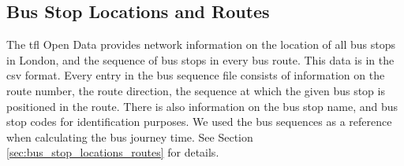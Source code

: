 \subsection{Bus Stop Locations and Routes}
\label{sec:bus_sequence}
\par The \acrshort{tfl} Open Data provides network information on the location of all bus stops in London, and the sequence of bus stops in every bus route. This data is in the \acrfull{csv} format. Every entry in the bus sequence file consists of information on the route number, the route direction, the sequence at which the given bus stop is positioned in the route. There is also information on the bus stop name, and bus stop codes for identification purposes. We used the bus sequences as a reference when calculating the bus journey time. See Section \ref{sec:bus_stop_locations_routes} for details.
